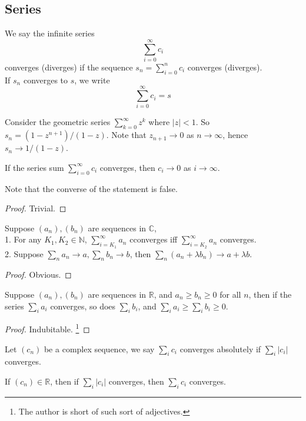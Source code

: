 \subsection{Series}
\begin{definition}
    We say the infinite series
    $$\sum_{i=0}^\infty c_i$$
    converges (diverges) if the sequence $s_n=\sum_{i=0}^nc_i$ converges (diverges).\\
    If $s_n$ converges to $s$, we write
    $$\sum_{i=0}^\infty c_i=s$$
\end{definition}
\begin{example}
    Consider the geometric series $\sum_{k=0}^\infty z^k$ where $|z|<1$.
    So $s_n=(1-z^{n+1})/(1-z)$.
    Note that $z_{n+1}\to 0$ as $n\to\infty$, hence $s_n\to 1/(1-z)$.
\end{example}
\begin{lemma}
    If the series sum $\sum_{i=0}^\infty c_i$ converges, then $c_i\to 0$ as $i\to\infty$.
\end{lemma}
Note that the converse of the statement is false.
\begin{proof}
    Trivial.
\end{proof}
\begin{lemma}
    Suppose $(a_n),(b_n)$ are sequences in $\mathbb C$,\\
    1. For any $K_1,K_2\in\mathbb N$, $\sum_{i=K_1}^\infty a_n$ cconverges iff $\sum_{i=K_2}^\infty a_n$ converges.\\
    2. Suppose $\sum_na_n\to a,\sum_nb_n\to b$, then $\sum_n(a_n+\lambda b_n)\to a+\lambda b$.
\end{lemma}
\begin{proof}
    Obvious.
\end{proof}
\begin{theorem}
    Suppose $(a_n),(b_n)$ are sequences in $\mathbb R$, and $a_n\ge b_n\ge 0$ for all $n$, then if the series $\sum_ia_i$ converges, so does $\sum_ib_i$, and $\sum_ia_i\ge\sum_ib_i\ge 0$.
\end{theorem}
\begin{proof}
    Indubitable.
    \footnote{The author is short of such sort of adjectives.}
\end{proof}
\begin{definition}
    Let $(c_n)$ be a complex sequence, we say $\sum_ic_i$ converges absolutely if $\sum_i|c_i|$ converges.
\end{definition}
\begin{lemma}
    If $(c_n)\in\mathbb R$, then if $\sum_{i}|c_i|$ converges, then $\sum_ic_i$ converges.
\end{lemma}

